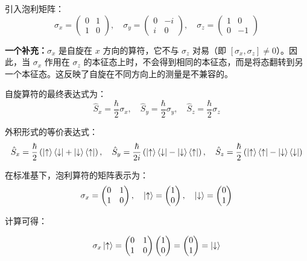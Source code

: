 \par
引入泡利矩阵：
\[
\sigma_x = \begin{pmatrix} 0 & 1 \\ 1 & 0 \end{pmatrix}, \quad
\sigma_y = \begin{pmatrix} 0 & -i \\ i & 0 \end{pmatrix}, \quad
\sigma_z = \begin{pmatrix} 1 & 0 \\ 0 & -1 \end{pmatrix}
\]\par

\textbf{一个补充：}$\sigma_{x}$ 是自旋在 $x$ 方向的算符，它不与 $\sigma_{z}$ 对易（即 $[\sigma_{x},\sigma_{z}]\neq 0$）。因此，当 $\sigma_{x}$ 作用在 $\sigma_{z}$ 的本征态上时，不会得到相同的本征态，而是将态翻转到另一个本征态。这反映了自旋在不同方向上的测量是不兼容的。

自旋算符的最终表达式为：
\[
\boxed{\hat{S}_x = \frac{\hbar}{2} \sigma_x, \quad
	\hat{S}_y = \frac{\hbar}{2} \sigma_y, \quad
	\hat{S}_z = \frac{\hbar}{2} \sigma_z}
\]

外积形式的等价表达式：
\[
\hat{S}_x = \frac{\hbar}{2} \left( \ket{\uparrow}\bra{\downarrow} + \ket{\downarrow}\bra{\uparrow} \right), \quad
\hat{S}_y = \frac{\hbar}{2i} \left( \ket{\uparrow}\bra{\downarrow} - \ket{\downarrow}\bra{\uparrow} \right),\quad
\hat{S}_z = \frac{\hbar}{2} \left( \ket{\uparrow}\bra{\uparrow} - \ket{\downarrow}\bra{\downarrow} \right)
\]

在标准基下，泡利算符的矩阵表示为：
\[
\sigma_{x} = \begin{pmatrix}
	0 & 1 \\
	1 & 0
\end{pmatrix}, \quad
\ket{\uparrow} = \begin{pmatrix}
	1 \\
	0
\end{pmatrix}, \quad
\ket{\downarrow}= \begin{pmatrix}
	0 \\
	1
\end{pmatrix}
\]

计算可得：

\[
\sigma_{x}\ket{\uparrow} = \begin{pmatrix}
	0 & 1 \\
	1 & 0
\end{pmatrix} \begin{pmatrix}
	1 \\
	0
\end{pmatrix} = \begin{pmatrix}
	0 \\
	1
\end{pmatrix} = \ket{\downarrow}
\]


